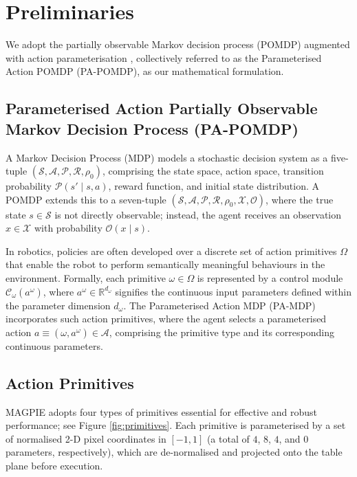 \documentclass[journal]{IEEEtran}
\begin{document}
\section{Preliminaries} \label{sec:preliminaries}

We adopt the partially observable Markov decision process (POMDP) \cite{kaelbling1998planning} augmented with action parameterisation \cite{masson2016reinforcement}, collectively referred to as the Parameterised Action POMDP (PA-POMDP), as our mathematical formulation.

\subsection{Parameterised Action Partially Observable Markov Decision Process (PA-POMDP)} \label{sec:PA-MDP}

A Markov Decision Process (MDP) models a stochastic decision system as a five-tuple $(\mathcal{S}, \mathcal{A}, \mathcal{P}, \mathcal{R}, \rho_0)$, comprising the state space, action space, transition probability $\mathcal{P}(s' \mid s, a)$, reward function, and initial state distribution. A POMDP extends this to a seven-tuple $(\mathcal{S}, \mathcal{A}, \mathcal{P}, \mathcal{R}, \rho_0, \mathcal{X}, \mathcal{O})$, where the true state $s \in \mathcal{S}$ is not directly observable; instead, the agent receives an observation $x \in \mathcal{X}$ with probability $\mathcal{O}(x \mid s)$.

In robotics, policies are often developed over a discrete set of action primitives $\Omega$ that enable the robot to perform semantically meaningful behaviours in the environment. Formally, each primitive $\omega \in \Omega$ is represented by a control module $\mathcal{C}_\omega(a^{\omega})$, where $a^{\omega} \in \mathbb{R}^{d_{\omega}}$ signifies the continuous input parameters defined within the parameter dimension $d_{\omega}$. The Parameterised Action MDP (PA-MDP) \cite{masson2016reinforcement} incorporates such action primitives, where the agent selects a parameterised action $a \equiv (\omega, a^{\omega}) \in \mathcal{A}$, comprising the primitive type and its corresponding continuous parameters.

\subsection{Action Primitives} \label{sec:action_primitives}

MAGPIE adopts four types of primitives essential for effective and robust performance; see Figure \ref{fig:primitives}. Each primitive is parameterised by a set of normalised 2-D pixel coordinates in $[-1, 1]$ (a total of $4$, $8$, $4$, and $0$ parameters, respectively), which are de-normalised and projected onto the table plane before execution.
\end{document}
